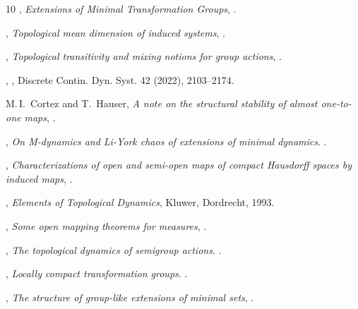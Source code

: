 \documentclass[12pt,final,3p,times]{elsarticle}
\theoremstyle{definition}
\numberwithin{equation}{section}
\begin{document}
\begin{thebibliography}{10}
,
\newblock \emph{Extensions of Minimal Transformation Groups},
.

,
\newblock \emph{Topological mean dimension of induced systems},
.

,
\newblock \emph{Topological transitivity and mixing notions for group actions},
.

   ,
   ,
   \newblock Discrete Contin. Dyn. Syst. 42 (2022), 2103--2174.

\newblock M.\,I.~Cortez and T.~Hauser,
\newblock \emph{A note on the structural stability of almost one-to-one maps},
.

,
\newblock \emph{On M-dynamics and Li-York chaos of extensions of minimal dynamics}.
.

,
\newblock \emph{Characterizations of open and semi-open maps of compact Hausdorff spaces by induced maps},
.

,
\newblock \emph{Elements of Topological Dynamics},
\newblock Kluwer, Dordrecht, 1993.

,
\newblock \emph{Some open mapping theorems for measures},
.

   ,
   \newblock \emph{The topological dynamics of semigroup actions}.
   .

   ,
   \newblock \emph{Locally compact transformation groups}.
   .
   
,
\newblock \emph{The structure of group-like extensions of minimal sets},
.


\end{thebibliography}
\end{document}
